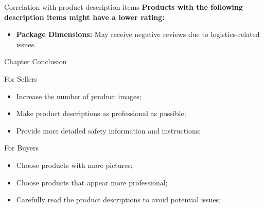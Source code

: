 \begin{frame}{Correlation with product description items}
	\footnotesize
	\textbf{Products with the following description items might have a lower rating:}
	\scriptsize
	\begin{itemize}
		\item \textbf{Package Dimensions:} May receive negative reviews due to logistics-related issues.
	\end{itemize}
	\normalsize

\end{frame}


\begin{frame}{Chapter Conclusion}

	\begin{block}{For Sellers}
		\begin{itemize}
			\item Increase the number of product images;
			\item Make product descriptions as professional as possible;
			\item Provide more detailed safety information and instructions;
		\end{itemize}
	\end{block}

	\begin{block}{For Buyers}
		\begin{itemize}
			\item Choose products with more pictures;
			\item Choose products that appear more professional;
			\item Carefully read the product descriptions to avoid potential issues;
		\end{itemize}
	\end{block}

\end{frame}



